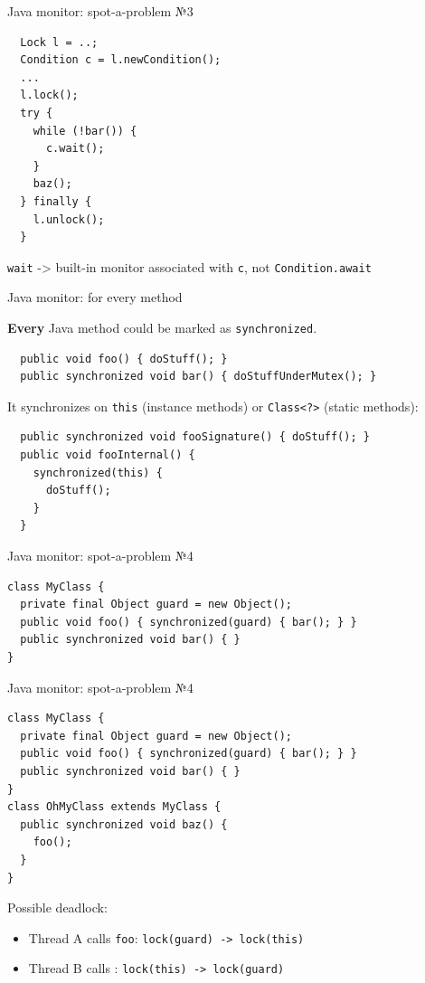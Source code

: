 \begin{frame}[fragile]{Java monitor: spot-a-problem №3}

\begin{verbatim}
  Lock l = ..;
  Condition c = l.newCondition();
  ...
  l.lock();
  try {
    while (!bar()) { 
      c.wait(); 
    }
    baz();
  } finally { 
    l.unlock(); 
  }
\end{verbatim}

\pause
\texttt{wait} -> built-in monitor associated with \texttt{c}, not \texttt{Condition.await}

\end{frame}


\begin{frame}[t,fragile]{Java monitor: for every method}

\textbf{Every} Java method could be marked as \texttt{synchronized}.
\begin{verbatim}
  public void foo() { doStuff(); }
  public synchronized void bar() { doStuffUnderMutex(); }
\end{verbatim}

It synchronizes on \texttt{this} (instance methods) or \texttt{Class<?>} (static methods):
\begin{verbatim}
  public synchronized void fooSignature() { doStuff(); }
  public void fooInternal() {
    synchronized(this) {
      doStuff();
    }
  }
\end{verbatim}
\end{frame}

\begin{frame}[t,fragile]{Java monitor: spot-a-problem №4}

\begin{verbatim}
class MyClass {
  private final Object guard = new Object();
  public void foo() { synchronized(guard) { bar(); } }
  public synchronized void bar() { }
}
\end{verbatim}

\end{frame}

\begin{frame}{Java monitor: spot-a-problem №4}

\begin{verbatim}
class MyClass {
  private final Object guard = new Object();
  public void foo() { synchronized(guard) { bar(); } }
  public synchronized void bar() { }
}
class OhMyClass extends MyClass {
  public synchronized void baz() { 
    foo();
  }
}
\end{verbatim}

\pause
Possible deadlock:
\begin{itemize}
    \item Thread A calls \texttt{foo}: \texttt{lock(guard) -> lock(this)}
    \item Thread B calls : \texttt{lock(this) -> lock(guard)}
\end{itemize}
\end{frame}

